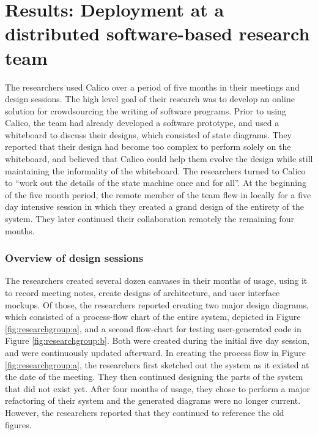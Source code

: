 \section{Results: Deployment at a distributed software-based research team}
\label{chapter:evaluation:deployment3}

The researchers used Calico over a period of five months in their meetings and design sessions. The high level goal of their research was to develop an online solution for crowdsourcing the writing of software programs. Prior to using Calico, the team had already developed a software prototype, and used a whiteboard to discuss their designs, which consisted of state diagrams. They reported that their design had become too complex to perform solely on the whiteboard, and believed that Calico could help them evolve the design while still maintaining the informality of the whiteboard. The researchers turned to Calico to ``work out the details of the state machine once and for all''. At the beginning of the five month period, the remote member of the team flew in locally for a five day intensive session in which they created a grand design of the entirety of the system. They later continued their collaboration remotely the remaining four months. 

\subsubsection{Overview of design sessions}

The researchers created several dozen canvases in their months of usage, using it to record meeting notes, create designs of architecture, and user interface mockups. Of those, the researchers reported creating two major design diagrams, which consisted of a process-flow chart of the entire system, depicted in Figure \ref{fig:researchgroup:a}, and a second flow-chart for testing user-generated code in Figure \ref{fig:researchgroup:b}. Both were created during the initial five day session, and were continuously updated afterward. In creating the process flow in Figure \ref{fig:researchgroup:a}, the researchers first sketched out the system as it existed at the date of the meeting. They then continued designing the parts of the system that did not exist yet. After four months of usage, they chose to perform a major refactoring of their system and the generated diagrams were no longer current. However, the researchers reported that they continued to reference the old figures.


